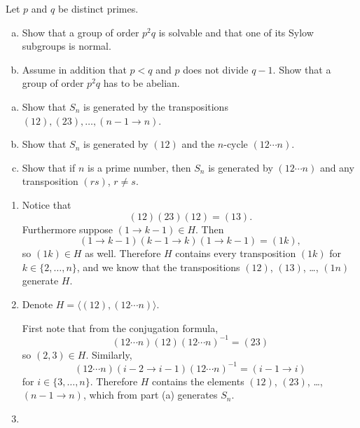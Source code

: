 \documentclass{article}
\newcounter{Problem}
\newenvironment{Problem}{\begin{Exercise}[name={Problem},
                                          counter={Problem}]}
                        {\end{Exercise}}
\begin{document}
\begin{Problem}
Let $p$ and $q$ be distinct primes.
\begin{enumerate}[(a)]
  \item{
    Show that a group of order $p^2 q$ is solvable and that one of its
    Sylow subgroups is normal.
  }
  \item{
    Assume in addition that $p < q$ and $p$ does not divide $q -
    1$. Show that a group of order $p^2 q$ has to be abelian.
  }
\end{enumerate}
\end{Problem}

\pagebreak

\begin{Problem}
  \begin{enumerate}[(a)]
    \item{
      Show that $S_n$ is generated by the transpositions
      $(12),(23),\dots,(n-1 \to n)$.
    }
    \item{
      Show that $S_n$ is generated by $(12)$ and the $n$-cycle
      $(12 \cdots n)$.
    }
    \item{
      Show that if $n$ is a prime number, then $S_n$ is generated by
      $(1 2 \cdots n)$ and any transposition $(rs)$, $r \neq s$.
    }
  \end{enumerate}
\end{Problem}

\begin{Answer}
\begin{enumerate}
  \item{
    Notice that
    $$
    (12)(23)(12) = (13).
    $$
    Furthermore suppose $(1 \to k - 1) \in H$. Then
    $$
    (1 \to k - 1)(k - 1 \to k)(1 \to k - 1) =
    (1k),
    $$
    so $(1k) \in H$ as well.
    Therefore $H$ contains every transposition $(1k)$ for
    $k \in \{ 2, \dots, n \}$, and we know that the transpositions
    $(12)$, $(13)$, \dots, $(1n)$ generate $H$.
  }
  \item{
    Denote $H = \langle (1 2), (1 2 \cdots n) \rangle$.

    First note that from the conjugation formula,
    $$
    (1 2 \cdots n)(1 2)(1 2 \cdots n)^{-1} = (2 3)
    $$
    so $(2, 3) \in H$.
    Similarly,
    $$
    (1 2 \cdots n)(i - 2 \to i - 1)(1 2 \cdots n)^{-1}
    = (i - 1 \to i)
    $$
    for $i \in \{ 3, \dots, n \}$.
    Therefore $H$ contains the elements
    $(12)$, $(23)$, \dots, $(n-1 \to n)$, which from part (a)
    generates $S_n$.
  }
  \item{
  }
\end{enumerate}
\end{Answer}
\end{document}
